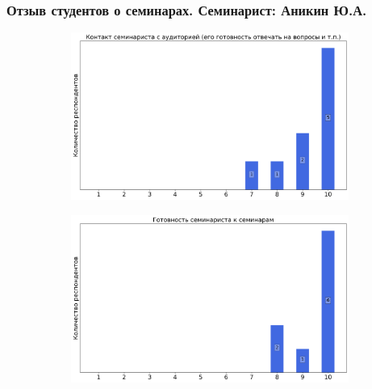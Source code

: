         \subsubsection{Отзыв студентов о семинарах. Семинарист: Аникин Ю.А.}
            \begin{figure}[H]
                \centering
                \begin{subfigure}[b]{0.45\textwidth}
                    \centering
                    \includegraphics[width=\textwidth]{images/3 course/Общая физика - квантовая физика/seminarists-marks-Аникин Ю.А.-0.png}
                \end{subfigure}
                \begin{subfigure}[b]{0.45\textwidth}
                    \centering
                    \includegraphics[width=\textwidth]{images/3 course/Общая физика - квантовая физика/seminarists-marks-Аникин Ю.А.-1.png}
                \end{subfigure}
                \begin{subfigure}[b]{0.45\textwidth}

\end{subfigure}
\end{figure}
